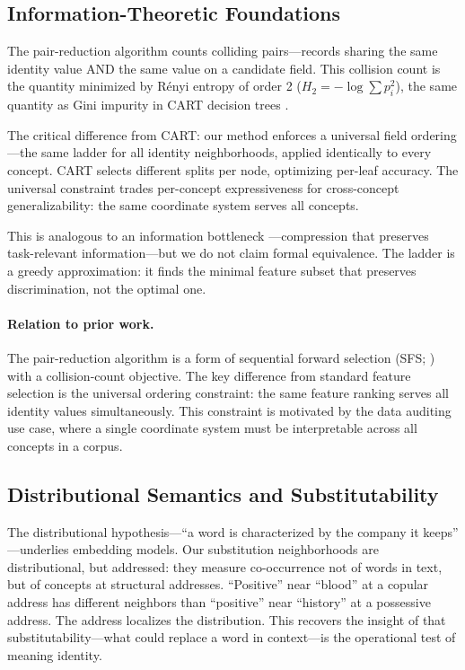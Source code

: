 \documentclass[11pt,a4paper]{article}
\begin{document}
\subsection{Information-Theoretic Foundations}

The pair-reduction algorithm counts colliding pairs---records sharing the same identity value AND the same value on a candidate field. This collision count is the quantity minimized by R\'{e}nyi entropy of order 2 ($H_2 = -\log\sum p_i^2$), the same quantity as Gini impurity in CART decision trees \citep{breiman1984}.

The critical difference from CART: our method enforces a universal field ordering---the same ladder for all identity neighborhoods, applied identically to every concept. CART selects different splits per node, optimizing per-leaf accuracy. The universal constraint trades per-concept expressiveness for cross-concept generalizability: the same coordinate system serves all concepts.

This is analogous to an information bottleneck \citep{tishby2000}---compression that preserves task-relevant information---but we do not claim formal equivalence. The ladder is a greedy approximation: it finds the minimal feature subset that preserves discrimination, not the optimal one.

\paragraph{Relation to prior work.} The pair-reduction algorithm is a form of sequential forward selection (SFS; \citealp{whitney1971}) with a collision-count objective. The key difference from standard feature selection is the universal ordering constraint: the same feature ranking serves all identity values simultaneously. This constraint is motivated by the data auditing use case, where a single coordinate system must be interpretable across all concepts in a corpus.

\subsection{Distributional Semantics and Substitutability}

The distributional hypothesis---``a word is characterized by the company it keeps'' \citep{firth1957}---underlies embedding models. Our substitution neighborhoods are distributional, but addressed: they measure co-occurrence not of words in text, but of concepts at structural addresses. ``Positive'' near ``blood'' at a copular address has different neighbors than ``positive'' near ``history'' at a possessive address. The address localizes the distribution. This recovers the insight of \citet{cruse1986} that substitutability---what could replace a word in context---is the operational test of meaning identity.
\end{document}
